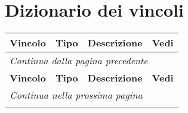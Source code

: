 \section{Dizionario dei vincoli}\label{sez:costraints}
\begin{longtable}{|p{}|p{}|p{}|p{}|}
	\hline
	\textbf{Vincolo} & \textbf{Tipo} & \textbf{Descrizione} & \textbf{Vedi} \\
	\hline
	\endfirsthead
	
	\multicolumn{4}{l}{\footnotesize\itshape Continua dalla pagina precedente} \\
	\hline
	\textbf{Vincolo} & \textbf{Tipo} & \textbf{Descrizione} & \textbf{Vedi}  \\
	\hline
	\endhead
	
	\hline
	\multicolumn{3}{r}{\footnotesize\itshape Continua nella prossima pagina} \\
	\endfoot
	

\end{longtable}
